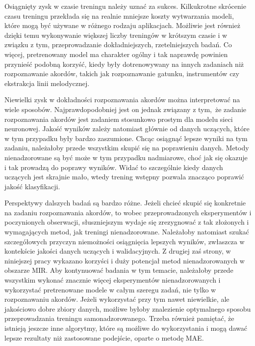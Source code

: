 Osiągnięty zysk w czasie treningu należy uznać za sukces. Kilkukrotne skrócenie czasu treningu przekłada się na realnie mniejsze koszty wytwarzania modeli, które mogą być używane w różnego rodzaju aplikacjach. Możliwie jest również dzięki temu wykonywanie większej liczby treningów w krótszym czasie i w związku z tym, przeprowadzanie dokładniejszych, rzetelniejszych badań. Co więcej, pretrenowany model ma charakter ogólny i tak naprawdę powinien przynieść podobną korzyść, kiedy były dotrenowywany na innych zadaniach niż rozpoznawanie akordów, takich jak rozpoznawanie gatunku, instrumentów czy ekstrakcja linii melodycznej.

Niewielki zysk w dokładności rozpoznawania akordów można interpretować na wiele sposobów. Najprawdopodobniej jest on jednak związany z tym, że zadanie rozpoznawania akordów jest zadaniem stosunkowo prostym dla modelu sieci neuronowej. Jakość wyników zależy natomiast głównie od danych uczących, które w tym przypadku były bardzo zaszumione. Chcąc osiągnąć lepsze wyniki na tym zadaniu, należałoby przede wszystkim skupić się na poprawieniu danych. Metody nienadzorowane są być może w tym przypadku nadmiarowe, choć jak się okazuje i tak prowadzą do poprawy wyników. Widać to szczególnie kiedy danych uczących jest skrajnie mało, wtedy trening wstępny pozwala znacząco poprawić jakość klasyfikacji.

Perspektywy dalszych badań są bardzo różne. Jeżeli chcieć skupić się konkretnie na zadaniu rozpoznawania akordów, to wobec przeprowadzonych eksperymentów i poczynionych obserwacji, słuszniejszym wydaje się zrezygnować z tak złożonych i wymagających metod, jak treningi nienadzorowane. Należałoby natomiast szukać szczegółowych przyczyn niemożności osiągnięcia lepszych wyników, zwłaszcza w kontekście jakości danych uczących i walidacyjnych. Z drugiej zaś strony, w niniejszej pracy wykazano korzyści i duży potencjał metod nienadzorowanych w obszarze MIR. Aby kontynuować badania w tym temacie, należałoby przede wszystkim wykonać znacznie więcej eksperymentów nienadzorowanych i wykorzystać pretrenowane modele w całym szeregu zadań, nie tylko w rozpoznawaniu akordów. Jeżeli wykorzystać przy tym nawet niewielkie, ale jakościowo dobre zbiory danych, możliwe byłoby znalezienie optymalnego sposobu przeprowadzania treningu samonadzorowanego. Trzeba również pamiętać, że istnieją jeszcze inne algorytmy, które są możliwe do wykorzystania i mogą dawać lepsze rezultaty niż zastosowane podejście, oparte o metodę MAE.
